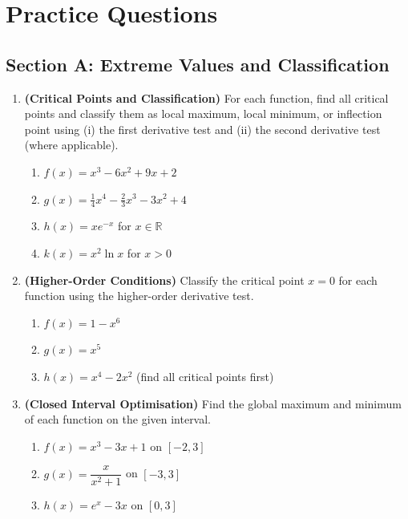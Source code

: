 \documentclass[12pt, a4paper]{article}
\theoremstyle{definition}
\newcommand{\R}{\mathbb{R}}
\begin{document}
\section{Practice Questions}

\subsection{Section A: Extreme Values and Classification}

\begin{enumerate}[label=\textbf{A\arabic*.}, leftmargin=2.5em]

\item \textbf{(Critical Points and Classification)}
For each function, find all critical points and classify them as local
maximum, local minimum, or inflection point using (i) the first derivative
test and (ii) the second derivative test (where applicable).
\begin{enumerate}[label=(\alph*)]
  \item $f(x) = x^3 - 6x^2 + 9x + 2$
  \item $g(x) = \frac{1}{4}x^4 - \frac{2}{3}x^3 - 3x^2 + 4$
  \item $h(x) = xe^{-x}$ for $x \in \R$
  \item $k(x) = x^2\ln x$ for $x > 0$
\end{enumerate}

\item \textbf{(Higher-Order Conditions)}
Classify the critical point $x=0$ for each function using the
higher-order derivative test.
\begin{enumerate}[label=(\alph*)]
  \item $f(x) = 1 - x^6$
  \item $g(x) = x^5$
  \item $h(x) = x^4 - 2x^2$ \; (find all critical points first)
\end{enumerate}

\item \textbf{(Closed Interval Optimisation)}
Find the global maximum and minimum of each function on the given interval.
\begin{enumerate}[label=(\alph*)]
  \item $f(x) = x^3 - 3x + 1$ on $[-2, 3]$
  \item $g(x) = \dfrac{x}{x^2+1}$ on $[-3, 3]$
  \item $h(x) = e^x - 3x$ on $[0, 3]$
\end{enumerate}


\end{enumerate}
\end{document}
